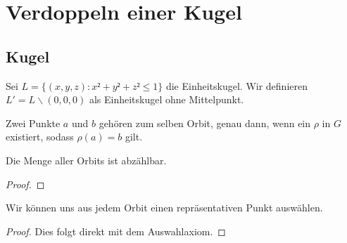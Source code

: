 \chapter{Verdoppeln einer Kugel}

\section{Kugel}
\begin{definition}\label{def:kugel_ohne_mittelpunkt}
Sei $L=\{(x,y,z):x²+y²+z²\leq1\}$ die Einheitskugel. Wir definieren $L'=L\backslash {(0,0,0)}$ als Einheitskugel ohne Mittelpunkt.
\leanok
\end{definition}

\begin{definition}[Orbit] \label{def:orbit} 
Zwei Punkte $a$ und $b$ gehören zum selben Orbit, genau dann, wenn ein $\rho$ in $G$ existiert, sodass $\rho(a)=b$ gilt.
\leanok {}
\end{definition}

\begin{lemma} \label{lemma:all_orbits_countable} 
Die Menge aller Orbits ist abzählbar.
\leanok {}   
\end{lemma}
\begin{proof}
\end{proof}



\begin{lemma} \label{theorem:rep_punkte}
Wir können uns aus jedem Orbit einen repräsentativen Punkt auswählen.
 \leanok
\end{lemma}
\begin{proof}  \leanok
Dies folgt direkt mit dem Auswahlaxiom.
\end{proof}

